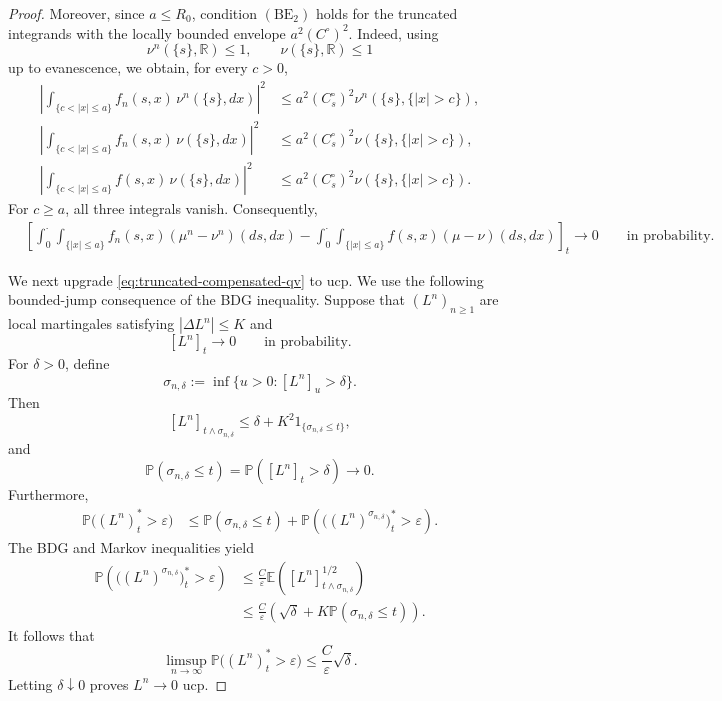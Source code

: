 \documentclass[a4paper,10pt]{article}
\newcommand{\E}{\mathbb E}
\renewcommand{\P}{\mathbb P}
\begin{document}
\begin{proof}
Moreover, since \(a\le R_0\), condition
\((\mathrm{BE}_2)\) holds for the truncated integrands with the
locally bounded envelope
$
        a^2(C^\circ)^2.
$
Indeed, using
\[
\nu^n(\{s\},\mathbb R)\le1,
\qquad
\nu(\{s\},\mathbb R)\le1
\]
up to evanescence, we obtain, for every \(c>0\),
\[
\begin{aligned}
\left|
\int_{\{c<|x|\le a\}}
f_n(s,x)\,\nu^n(\{s\},dx)
\right|^2
&\le
a^2(C^\circ_s)^2
\nu^n(\{s\},\{|x|>c\}),\\
\left|
\int_{\{c<|x|\le a\}}
f_n(s,x)\,\nu(\{s\},dx)
\right|^2
&\le
a^2(C^\circ_s)^2
\nu(\{s\},\{|x|>c\}),\\
\left|
\int_{\{c<|x|\le a\}}
f(s,x)\,\nu(\{s\},dx)
\right|^2
&\le
a^2(C^\circ_s)^2
\nu(\{s\},\{|x|>c\}).
\end{aligned}
\]
For \(c\ge a\), all three integrals vanish. Consequently,
\begin{align}
&\left[
\int_0^\cdot\int_{\{|x|\le a\}}
f_n(s,x)(\mu^n-\nu^n)(ds,dx)
-
\int_0^\cdot\int_{\{|x|\le a\}}
f(s,x)(\mu-\nu)(ds,dx)
\right]_t
\longrightarrow0
\qquad\text{in probability}.
\label{eq:truncated-compensated-qv}
\end{align}

We next upgrade
\eqref{eq:truncated-compensated-qv} to ucp. We use the following
bounded-jump consequence of the BDG inequality. Suppose that
\((L^n)_{n\ge1}\) are local martingales satisfying
$
        |\Delta L^n|\le K
$
and
\[
        [L^n]_t\longrightarrow0
        \qquad\text{in probability}.
\]
For \(\delta>0\), define
\[
        \sigma_{n,\delta}
        :=
        \inf\{u>0:[L^n]_u>\delta\}.
\]
Then
\[
[L^n]_{t\wedge\sigma_{n,\delta}}
\le
\delta
+
K^2 1_{\{\sigma_{n,\delta}\le t\}},
\]
and
\[
\P(\sigma_{n,\delta}\le t)
=
\P([L^n]_t>\delta)
\longrightarrow0.
\]
Furthermore,
\[
\begin{aligned}
\P\bigl((L^n)^*_t>\varepsilon\bigr)
&\le
\P(\sigma_{n,\delta}\le t)
+
\P\left(
\bigl((L^n)^{\sigma_{n,\delta}}\bigr)^*_t
>\varepsilon
\right).
\end{aligned}
\]
The BDG and Markov inequalities yield
\[
\begin{aligned}
\P\left(
\bigl((L^n)^{\sigma_{n,\delta}}\bigr)^*_t
>\varepsilon
\right)
&\le
\frac{C}{\varepsilon}
\E\left(
[L^n]_{t\wedge\sigma_{n,\delta}}^{1/2}
\right)
\\
&\le
\frac{C}{\varepsilon}
\left(
\sqrt{\delta}
+
K\P(\sigma_{n,\delta}\le t)
\right).
\end{aligned}
\]
It follows that
\[
\limsup_{n\to\infty}
\P\bigl((L^n)^*_t>\varepsilon\bigr)
\le
\frac{C}{\varepsilon}\sqrt{\delta}.
\]
Letting \(\delta\downarrow0\) proves \(L^n\to0\) ucp.


\end{proof}
\end{document}
